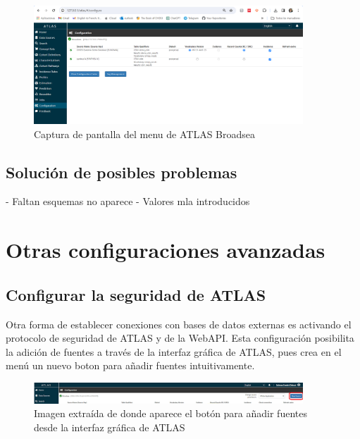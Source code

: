 \begin{enumerate}
\begin{figure}[H]
    \centering
    \includegraphics[width=0.90\textwidth]{figures/showConfiguration.png}
    \caption{Captura de pantalla del menu  de ATLAS Broadsea}
    \label{fig:showConfiguration}
\end{figure}
\end{enumerate}


\subsection{Solución de posibles problemas}

- Faltan esquemas no aparece
- Valores mla introducidos

\section{Otras configuraciones avanzadas} \label{cap:04ConfigAvanzada}

\subsection{Configurar la seguridad de ATLAS}

Otra forma de establecer conexiones con bases de datos externas es activando el protocolo de seguridad de ATLAS y de la WebAPI. Esta configuración posibilita la adición de fuentes a través de la interfaz gráfica de ATLAS, pues crea en el menú  un nuevo boton para añadir fuentes intuitivamente. 

\begin{figure}[H]
    \centering
    \includegraphics[width=0.90\textwidth]{figures/capNewSource.png}
    \caption{Imagen extraída de \cite{forumAddMSDB} donde aparece el botón para añadir fuentes desde la interfaz gráfica de ATLAS}
    \label{fig:capNewSource}
\end{figure}

